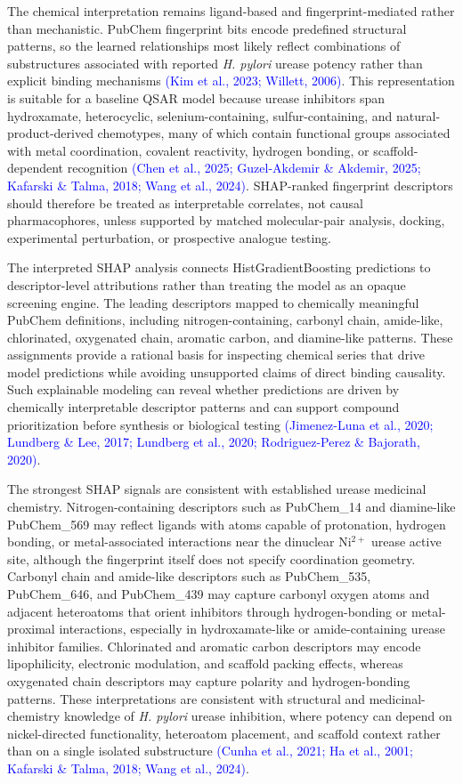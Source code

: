\documentclass[11pt]{article}
\begin{document}
The chemical interpretation remains ligand-based and fingerprint-mediated rather than mechanistic. PubChem fingerprint bits encode predefined structural patterns, so the learned relationships most likely reflect combinations of substructures associated with reported \textit{H. pylori} urease potency rather than explicit binding mechanisms \textcolor{blue}{(Kim et al., 2023; Willett, 2006)}. This representation is suitable for a baseline QSAR model because urease inhibitors span hydroxamate, heterocyclic, selenium-containing, sulfur-containing, and natural-product-derived chemotypes, many of which contain functional groups associated with metal coordination, covalent reactivity, hydrogen bonding, or scaffold-dependent recognition \textcolor{blue}{(Chen et al., 2025; Guzel-Akdemir \& Akdemir, 2025; Kafarski \& Talma, 2018; Wang et al., 2024)}. SHAP-ranked fingerprint descriptors should therefore be treated as interpretable correlates, not causal pharmacophores, unless supported by matched molecular-pair analysis, docking, experimental perturbation, or prospective analogue testing.

The interpreted SHAP analysis connects HistGradientBoosting predictions to descriptor-level attributions rather than treating the model as an opaque screening engine. The leading descriptors mapped to chemically meaningful PubChem definitions, including nitrogen-containing, carbonyl chain, amide-like, chlorinated, oxygenated chain, aromatic carbon, and diamine-like patterns. These assignments provide a rational basis for inspecting chemical series that drive model predictions while avoiding unsupported claims of direct binding causality. Such explainable modeling can reveal whether predictions are driven by chemically interpretable descriptor patterns and can support compound prioritization before synthesis or biological testing \textcolor{blue}{(Jimenez-Luna et al., 2020; Lundberg \& Lee, 2017; Lundberg et al., 2020; Rodriguez-Perez \& Bajorath, 2020)}.

The strongest SHAP signals are consistent with established urease medicinal chemistry. Nitrogen-containing descriptors such as PubChem\_14 and diamine-like PubChem\_569 may reflect ligands with atoms capable of protonation, hydrogen bonding, or metal-associated interactions near the dinuclear Ni$^{2+}$ urease active site, although the fingerprint itself does not specify coordination geometry. Carbonyl chain and amide-like descriptors such as PubChem\_535, PubChem\_646, and PubChem\_439 may capture carbonyl oxygen atoms and adjacent heteroatoms that orient inhibitors through hydrogen-bonding or metal-proximal interactions, especially in hydroxamate-like or amide-containing urease inhibitor families. Chlorinated and aromatic carbon descriptors may encode lipophilicity, electronic modulation, and scaffold packing effects, whereas oxygenated chain descriptors may capture polarity and hydrogen-bonding patterns. These interpretations are consistent with structural and medicinal-chemistry knowledge of \textit{H. pylori} urease inhibition, where potency can depend on nickel-directed functionality, heteroatom placement, and scaffold context rather than on a single isolated substructure \textcolor{blue}{(Cunha et al., 2021; Ha et al., 2001; Kafarski \& Talma, 2018; Wang et al., 2024)}.
\end{document}
